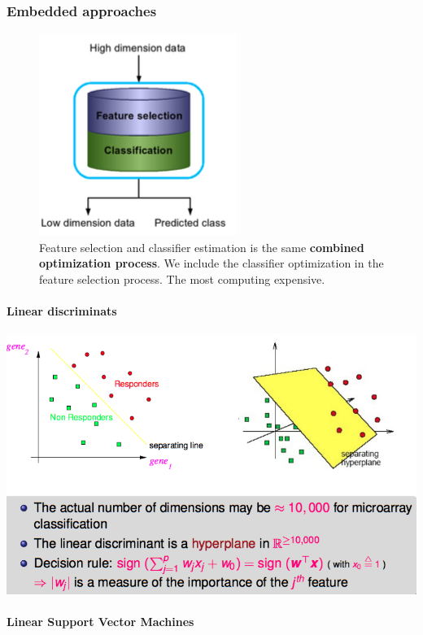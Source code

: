 \subsubsection{Embedded approaches}

\begin{figure}[H]
	\centering
	\includegraphics[scale=0.6]{images/59_embedded.png}
	\caption{Feature selection and classifier estimation is the same \textbf{combined optimization process}. We include the classifier optimization in the feature selection process. The most computing expensive.}
\end{figure}

\paragraph{Linear discriminats}

\begin{center}
	\includegraphics[scale=0.5]{images/67_linear.png}
\end{center}
\newpage
\paragraph{Linear Support Vector Machines}

